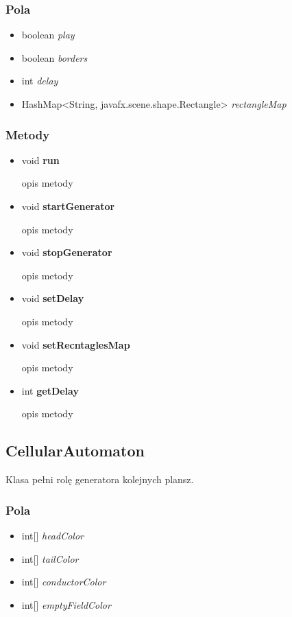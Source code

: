 \documentclass[a4paper,11pt]{article}
\begin{document}
\subsubsection{Pola}
\begin{itemize}
\item boolean \textit{play}
\item boolean \textit{borders}
\item int \textit{delay}
\item HashMap<String, javafx.scene.shape.Rectangle> \textit{rectangleMap}
\end{itemize}

\subsubsection{Metody}
\begin{itemize}
\item void  \textbf{run}

opis metody
\item void  \textbf{startGenerator}

opis metody
\item void  \textbf{stopGenerator}

opis metody
\item void  \textbf{setDelay}

opis metody
\item void  \textbf{setRecntaglesMap}

opis metody
\item int  \textbf{getDelay}

opis metody

\end{itemize}

\subsection{CellularAutomaton}
Klasa pełni rolę generatora kolejnych plansz.

\subsubsection{Pola}
\begin{itemize}
\item int[]  \textit{headColor}
\item int[]  \textit{tailColor}
\item int[]  \textit{conductorColor}
\item int[]  \textit{emptyFieldColor}
\end{itemize}
\end{document}
